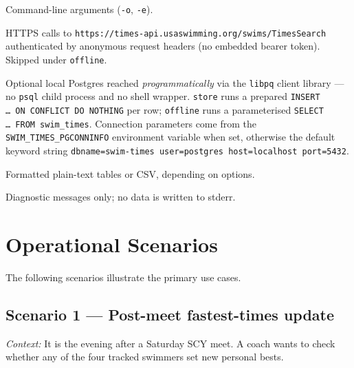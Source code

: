 \documentclass[12pt]{article}
\newcommand{\code}[1]{\texttt{#1}}
\begin{document}
\begin{description}[style=nextline]
  \item[Input.]
        Command-line arguments (\code{-o}, \code{-e}).

  \item[Network.]
        HTTPS calls to
        \texttt{https://times-api.usaswimming.org/swims/TimesSearch}
        authenticated by anonymous request headers (no embedded
        bearer token).  Skipped under \code{offline}.

  \item[Database.]
        Optional local Postgres reached \emph{programmatically}
        via the \texttt{libpq} client library --- no
        \texttt{psql} child process and no shell wrapper.
        \code{store} runs a prepared
        \texttt{INSERT \dots\ ON~CONFLICT~DO~NOTHING} per row;
        \code{offline} runs a parameterised
        \texttt{SELECT \dots\ FROM swim\_times}.  Connection
        parameters come from the
        \texttt{SWIM\_TIMES\_PGCONNINFO} environment variable
        when set, otherwise the default keyword string
        \texttt{dbname=swim-times user=postgres host=localhost
        port=5432}.

  \item[Standard output.]
        Formatted plain-text tables or CSV, depending on options.

  \item[Standard error.]
        Diagnostic messages only; no data is written to stderr.
\end{description}

\section{Operational Scenarios}

The following scenarios illustrate the primary use cases.

\subsection{Scenario 1 --- Post-meet fastest-times update}

\textit{Context:} It is the evening after a Saturday SCY meet.
A coach wants to check whether any of the four tracked swimmers
set new personal bests.
\end{document}
